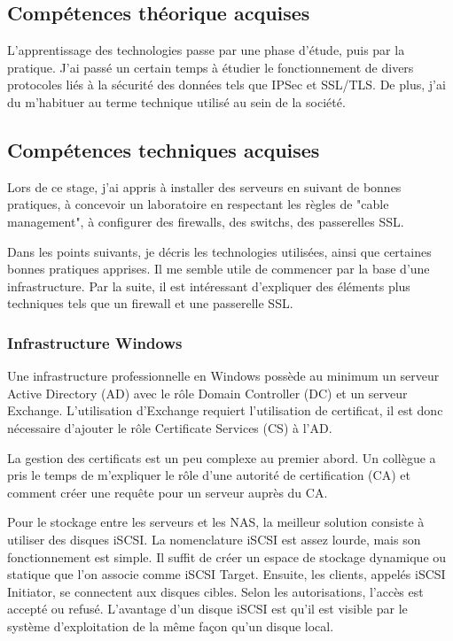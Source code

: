 \subsection{Compétences théorique acquises}
L'apprentissage des technologies passe par une phase d'étude, puis par la pratique.
J'ai passé un certain temps à étudier le fonctionnement de divers protocoles liés à la sécurité des données tels que IPSec et SSL/TLS.
De plus, j'ai du m'habituer au terme technique utilisé au sein de la société.

\subsection{Compétences techniques acquises}
Lors de ce stage, j'ai appris à installer des serveurs en suivant de bonnes pratiques, à concevoir un laboratoire en respectant les règles de "cable management", à configurer des firewalls, des switchs, des passerelles SSL. 

Dans les points suivants, je décris les technologies utilisées, ainsi que certaines bonnes pratiques apprises.
Il me semble utile de commencer par la base d'une infrastructure.
Par la suite, il est intéressant d'expliquer des éléments plus techniques tels que un firewall et une passerelle SSL. 
\subsubsection{Infrastructure Windows}
Une infrastructure professionnelle en Windows possède au minimum un serveur Active Directory (AD) avec le rôle Domain Controller (DC) et un serveur Exchange. 
L'utilisation d'Exchange requiert l'utilisation de certificat, il est donc nécessaire d'ajouter le rôle Certificate Services (CS) à l'AD.

La gestion des certificats est un peu complexe au premier abord.
Un collègue a pris le temps de m'expliquer le rôle d'une autorité de certification (CA) et comment créer une requête pour un serveur auprès du CA. 

Pour le stockage entre les serveurs et les NAS, la meilleur solution consiste à utiliser des disques iSCSI.
La nomenclature iSCSI est assez lourde, mais son fonctionnement est simple. 
Il suffit de créer un espace de stockage dynamique ou statique que l'on associe comme iSCSI Target. 
Ensuite, les clients, appelés iSCSI Initiator, se connectent aux disques cibles. 
Selon les autorisations, l'accès est accepté ou refusé.
L'avantage d'un disque iSCSI est qu'il est visible par le système d'exploitation de la même façon qu'un disque local. 

